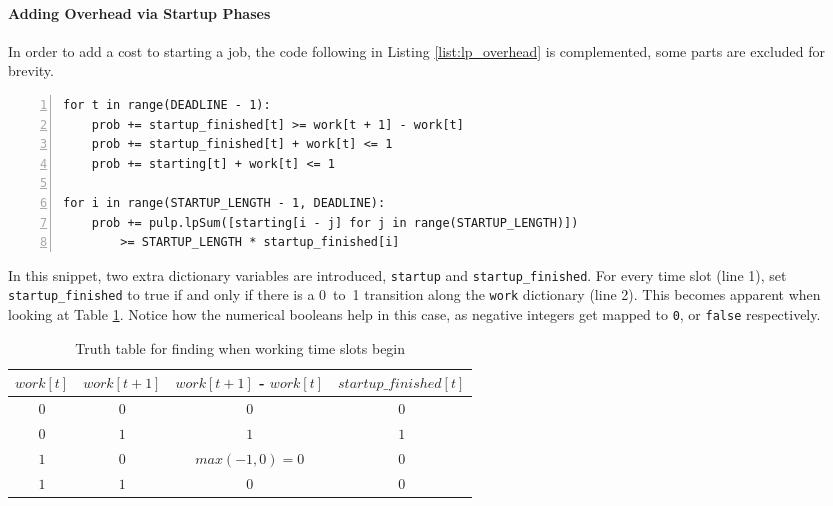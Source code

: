 \newpage
\paragraph{Adding Overhead via Startup Phases}

In order to add a cost to starting a job, the code following in Listing \ref{list:lp_overhead} is complemented, some parts are excluded for brevity.

\begin{minipage}{\linewidth} %
\begin{lstlisting}[frame=single, numbers=left, caption={LP Implementation for overhead}, label={list:lp_overhead}, basicstyle=\ttfamily]
for t in range(DEADLINE - 1):
    prob += startup_finished[t] >= work[t + 1] - work[t]
    prob += startup_finished[t] + work[t] <= 1
    prob += starting[t] + work[t] <= 1

for i in range(STARTUP_LENGTH - 1, DEADLINE):
    prob += pulp.lpSum([starting[i - j] for j in range(STARTUP_LENGTH)]) 
        >= STARTUP_LENGTH * startup_finished[i]
\end{lstlisting}
\end{minipage}


In this snippet, two extra dictionary variables are introduced, \verb|startup| and \verb|startup_finished|.
For every time slot (line 1), set \verb|startup_finished| to true if and only if there is a 0~to~1 transition along the \verb|work| dictionary (line 2). This becomes apparent when looking at Table \ref{tab:truth_table_startup_finished}.
Notice how the numerical booleans help in this case, as negative integers get mapped to \verb|0|, or \verb|false| respectively.

\begin{table}[h!]
\centering
\begin{tabular}{|c|c|c|c|}
\hline
    $work[t]$ & $work[t+1]$ & $work[t+1]$ - $work[t]$ & $startup\_finished[t]$ \\ \hline
    $0$ & $0$ & $0$ & $0$ \\ \hline
    $0$ & $1$ & $1$ & $1$ \\ \hline
    $1$ & $0$ & $max(-1, 0) = 0$ & $0$ \\ \hline
    $1$ & $1$ & $0$ & $0$ \\ \hline
\end{tabular}
\caption{Truth table for finding when working time slots begin}
\label{tab:truth_table_startup_finished}
\end{table}

